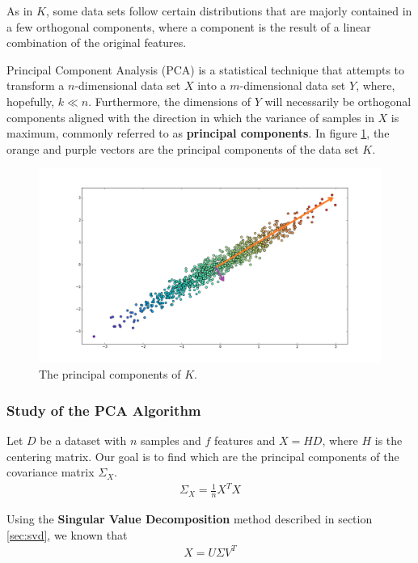 \documentclass[12pt]{article}
\begin{document}
As in $K$, some data sets follow certain distributions that are majorly contained in a few orthogonal components, where a component is the result of a linear combination of the original features.

Principal Component Analysis (PCA) is a statistical technique that attempts to transform a $n$-dimensional data set $X$ into a $m$-dimensional data set $Y$, where, hopefully, $k \ll n$. Furthermore, the dimensions of $Y$ will necessarily be orthogonal components aligned with the direction in which the variance of samples in $X$ is maximum, commonly referred to as \textbf{principal components}. \cite{pca1989} In figure \ref{fig:datasetrpc}, the orange and purple vectors are the principal components of the data set $K$.

\begin{figure}[H]
	\centering
	\captionsetup{justification=centering}
	\includegraphics[width=.8\linewidth]{datasetrpc}
	\caption{The principal components of $K$.}
	\label{fig:datasetrpc}
\end{figure}

\subsubsection{Study of the PCA Algorithm}

Let $D$ be a dataset with $n$ samples and $f$ features and $X=HD$, where $H$ is the centering matrix. Our goal is to find which are the principal components of the covariance matrix $\Sigma_X$.
\begin{align}
	\label{eq:pca-cov}
	\Sigma_X=\frac{1}{n} X^TX
\end{align}

Using the \textbf{Singular Value Decomposition} method described in section \ref{sec:svd}, we known that
\begin{align}
	\label{eq:pca-svd}
	X = U\Sigma V^T
\end{align}
\end{document}
